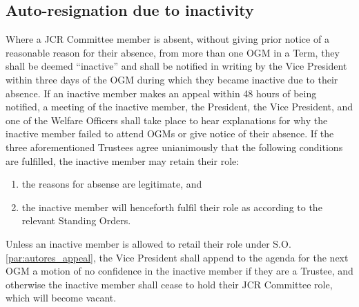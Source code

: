\subsection{Auto-resignation due to inactivity}
\npara Where a JCR Committee member is absent, without giving prior notice of a reasonable reason for their absence, from more than one OGM in a Term, they shall be deemed ``inactive'' and shall be notified in writing by the Vice President within three days of the OGM during which they became inactive due to their absence.
\npara \label{par:autores_appeal}If an inactive member makes an appeal within 48 hours of being notified, a meeting of the inactive member, the President, the Vice President, and one of the Welfare Officers shall take place to hear explanations for why the inactive member failed to attend OGMs or give notice of their absence. If the three aforementioned Trustees agree unianimously that the following conditions are fulfilled, the inactive member may retain their role:
\begin{enumerate}
	\item the reasons for absense are legitimate, and
	\item the inactive member will henceforth fulfil their role as according to the relevant Standing Orders.
\end{enumerate}
\npara Unless an inactive member is allowed to retail their role under S.O. \ref{par:autores_appeal}, the Vice President shall append to the agenda for the next OGM a motion of no confidence in the inactive member if they are a Trustee, and otherwise the inactive member shall cease to hold their JCR Committee role, which will become vacant.
